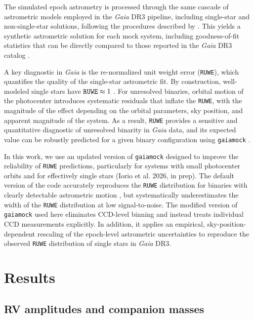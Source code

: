 \documentclass[trackchanges,twocolumn]{aastex631}
\begin{document}
The simulated epoch astrometry is processed through the same cascade of astrometric models employed in the {\it Gaia} DR3 pipeline, including single-star and non-single-star solutions, following the procedures described by \citet{Halbwachs23}. This yields a synthetic astrometric solution for each mock system, including goodness-of-fit statistics that can be directly compared to those reported in the {\it Gaia} DR3 catalog \citep[][]{ElBadry24, ElBadry25}.

A key diagnostic in {\it Gaia} is the re-normalized unit weight error ({\tt RUWE}), which quantifies the quality of the single-star astrometric fit.
By construction, well-modeled single stars have ${\tt RUWE}\approx1$ \citep{Lindegren18}. For unresolved binaries, orbital motion of the photocenter introduces systematic residuals that inflate the {\tt RUWE}, with the magnitude of the effect depending on the orbital parameters, sky position, and apparent magnitude of the system. As a result, {\tt RUWE} provides a sensitive and quantitative diagnostic of unresolved binarity in {\it Gaia} data, and its expected value can be robustly predicted for a given binary configuration using {\tt gaiamock} \citep[e.g.,][]{ElBadry24,ElBadry25}.

In this work, we use an updated version of {\tt gaiamock} designed to improve the reliability of {\tt RUWE} predictions, particularly for systems with small photocenter orbits and for effectively single stars (Iorio et al. 2026, in prep). The default version of the code accurately reproduces the {\tt RUWE} distribution for binaries with clearly detectable astrometric motion \citep[e.g.,][]{ElBadry25}, but systematically underestimates the width of the {\tt RUWE} distribution at low signal-to-noise. The modified version of {\tt gaiamock} used here eliminates CCD-level binning and instead treats individual CCD measurements explicitly. In addition, it applies an empirical, sky-position-dependent rescaling of the epoch-level astrometric uncertainties to reproduce the observed {\tt RUWE} distribution of single stars in {\it Gaia} DR3.


\section{Results}\label{sec:results}

\subsection{RV amplitudes and companion masses}\label{subsec:results_rvamps}
\end{document}
